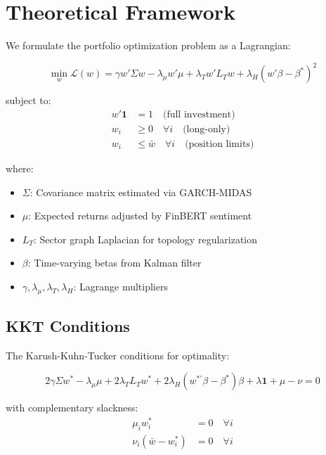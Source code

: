 \documentclass[12pt]{article}
\begin{document}
\section{Theoretical Framework}

We formulate the portfolio optimization problem as a Lagrangian:

\begin{equation}
\min_{w} \mathcal{L}(w) = \gamma w'\Sigma w - \lambda_\mu w'\mu + \lambda_T w'L_T w + \lambda_H (w'\beta - \beta^*)^2
\end{equation}

subject to:
\begin{align}
w'\mathbf{1} &= 1 \quad \text{(full investment)} \\
w_i &\geq 0 \quad \forall i \quad \text{(long-only)} \\
w_i &\leq \bar{w} \quad \forall i \quad \text{(position limits)}
\end{align}

where:
\begin{itemize}
\item $\Sigma$: Covariance matrix estimated via GARCH-MIDAS
\item $\mu$: Expected returns adjusted by FinBERT sentiment
\item $L_T$: Sector graph Laplacian for topology regularization
\item $\beta$: Time-varying betas from Kalman filter
\item $\gamma, \lambda_\mu, \lambda_T, \lambda_H$: Lagrange multipliers
\end{itemize}

\subsection{KKT Conditions}

The Karush-Kuhn-Tucker conditions for optimality:

\begin{equation}
2\gamma \Sigma w^* - \lambda_\mu \mu + 2\lambda_T L_T w^* + 2\lambda_H (w^{*\prime}\beta - \beta^*)\beta + \lambda \mathbf{1} + \mu - \nu = 0
\end{equation}

with complementary slackness:
\begin{align}
\mu_i w_i^* &= 0 \quad \forall i \\
\nu_i (\bar{w} - w_i^*) &= 0 \quad \forall i
\end{align}
\end{document}
